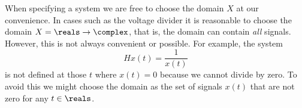 \begin{test}


\end{test}




When specifying a system we are free to choose the domain $X$ at our convenience.  In cases such as the voltage divider it is reasonable to choose the domain $X = \reals \to \complex$, that is, the domain can contain \emph{all} signals.  However, this is not always convenient or possible.  For example, the system
\[
Hx(t) = \frac{1}{x(t)}
\]
is not defined at those $t$ where $x(t) = 0$ because we cannot divide by zero.  To avoid this we might choose the domain as the set of signals $x(t)$ that are not zero for any $t \in \reals$.

